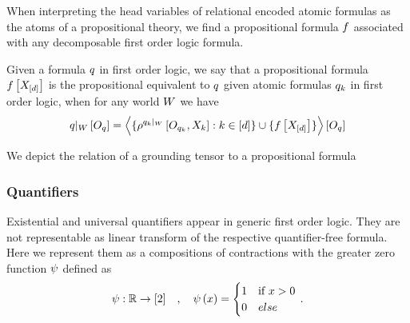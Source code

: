 
When interpreting the head variables of relational encoded atomic formulas as the atoms of a propositional theory, we find a propositional formula $f$ associated with any decomposable first order logic formula.

\begin{definition}\label{def:propositionalEquivalent}
	Given a formula $q$ in first order logic, we say that a propositional formula $f\left[X_{[d]}\right]$ is the propositional equivalent to $q$ given atomic formulas $q_{k}$ in first order logic, when for any world $W$ we have
	\begin{align}
		{q}|_{W} \left[O_{q}\right]
		= \left\langle  
		\{\rho^{{q_{k}}|_{W}}\left[O_{q_{k}}, X_{k}\right] : k\in[d]\} 
		\cup \{f\left[X_{[d]}\right] \}
		\right\rangle \left[ O_{q} \right]
	\end{align}
\end{definition}



We depict the relation of a grounding tensor to a propositional formula 
\begin{center}
	
\end{center}




\subsubsection{Quantifiers}


Existential and universal quantifiers appear in generic first order logic.
They are not representable as linear transform of the respective quantifier-free formula.
Here we represent them as a compositions of contractions with the greater zero function $\psi$ defined as
\begin{align*}
	\psi : \mathbb{R} \rightarrow [2] \quad, \quad \psi\left(x\right) = 
	\begin{cases}
		1 &  \text{if  } x > 0\\
		0 & else
	\end{cases} \, .
\end{align*}


